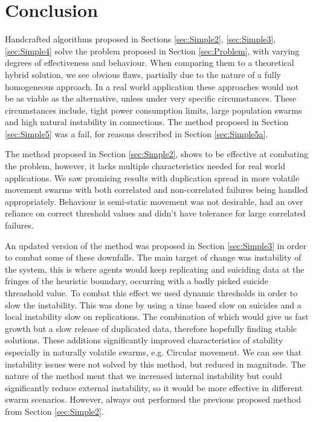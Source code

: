 \documentclass{UoYCSproject}
\begin{document}
\section{Conclusion}
\label{sec:conc}

Handcrafted algorithms proposed in Sections \ref{sec:Simple2}, \ref{sec:Simple3}, \ref{sec:Simple4} solve the problem proposed in Section \ref{sec:Problem}, with varying degrees of effectiveness and behaviour. 
When comparing them to a theoretical hybrid solution, we see obvious flaws, partially due to the nature of a fully homogeneous approach. 
In a real world application these approaches would not be as viable as the alternative, unless under very specific circumstances. 
These circumstances include, tight power consumption limits, large population swarms and high natural instability in connections. 
The method proposed in Section \ref{sec:Simple5} was a fail, for reasons described in Section \ref{sec:Simple5a}.

The method proposed in Section \ref{sec:Simple2}, shows to be effective at combating the problem, however, it lacks multiple characteristics needed for real world applications. 
We saw promising results with duplication spread in more volatile movement swarms with both correlated and non-correlated failures being handled appropriately. 
Behaviour is semi-static movement was not desirable, had an over reliance on correct threshold values and didn’t have tolerance for large correlated failures.

An updated version of the method was proposed in Section \ref{sec:Simple3} in order to combat some of these downfalls. 
The main target of change was instability of the system, this is where agents would keep replicating and suiciding data at the fringes of the heuristic boundary, occurring with a badly picked suicide threashold value. 
To combat this effect we used dynamic thresholds in order to slow the instability. 
This was done by using a time based slow on suicides and a local instability slow on replications. 
The combination of which would give us fast growth but a slow release of duplicated data, therefore hopefully finding stable solutions. 
These additions significantly improved characteristics of stability especially in naturally volatile swarms, e.g. Circular movement. 
We can see that instability issues were not solved by this method, but reduced in magnitude. 
The nature of the method ment that we increased internal instability but could significantly reduce external instability, so it would be more effective in different swarm scenarios. 
However, always out performed the previous proposed method from Section \ref{sec:Simple2}.
\end{document}
